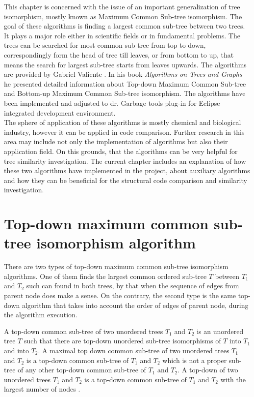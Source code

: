\documentclass{report}
\begin{document}
This chapter is concerned with the issue of an important generalization of tree isomorphism, mostly known as Maximum Common Sub-tree isomorphism. The goal of these algorithms is finding a largest common sub-tree between two trees. It plays a major role either in scientific fields or in fundamental problems. The trees can be searched for most common sub-tree from top to down, correspondingly form the head of tree till leaves, or from bottom to up, that means the search for largest sub-tree starts from leaves upwards. The algorithms are provided by Gabriel Valiente \cite{valiente}. In his book \emph{Algorithms on Trees and Graphs} he presented detailed information about Top-down Maximum Common Sub-tree and Bottom-up Maximum Common Sub-tree isomorphism. The algorithms have been implemented and adjusted to dr. Garbage tools plug-in for Eclipse integrated development environment.
\\
The sphere of application of these algorithms is mostly chemical and biological industry, however it can be applied in code comparison. Further research in this area may include not only the implementation of algorithms but also their application field. On this grounds, that the algorithms can be very helpful for tree similarity investigation. The current chapter includes an explanation of how these two algorithms have implemented in the project, about auxiliary algorithms and how they can be beneficial for the structural code comparison and similarity investigation.



\section{Top-down maximum common sub-tree isomorphism algorithm}
\label{sec:topdown}

There are two types of top-down maximum common sub-tree isomorphism algorithms. One of them finds the largest common ordered sub-tree $T$ between $ T_{1}$ and $ T_{2}$ such can found in both trees, by that when the sequence of edges from parent node does make a sense. On the contrary, the second type is the same top-down algorithm that takes into account the order of edges of parent node, during the algorithm execution. 

A top-down common sub-tree of two unordered trees $ T_{1}$ and $ T_{2 }$ is an unordered tree $T$ such that there are top-down unordered sub-tree isomorphisms of $ T$ into $ T_{1}$ and into $ T_{2}$. A maximal top down common sub-tree of two unordered  trees $ T_{1}$ and $ T_{2}$ is a top-down common sub-tree of $ T_{1}$ and $ T_{2}$ which is not a proper sub-tree of any other top-down common sub-tree of $ T_{1}$ and $ T_{2}$. A top-down of two unordered trees $ T_{1}$ and $ T_{2}$ is a top-down common sub-tree of $ T_{1}$ and $ T_{2}$ with the largest number of nodes \cite{valiente}.
\end{document}
